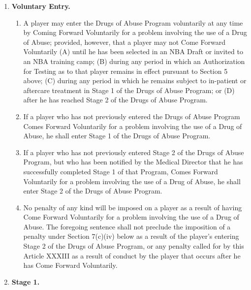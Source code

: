 \documentclass[
]{book}
\providecommand{\tightlist}{%
  \setlength{\itemsep}{0pt}\setlength{\parskip}{0pt}}
\begin{document}
\begin{enumerate}
\def\labelenumi{(\alph{enumi})}
\tightlist
\item
  \textbf{Voluntary Entry.}

  \begin{enumerate}
  \def\labelenumii{(\roman{enumii})}
  \tightlist
  \item
    A player may enter the Drugs of Abuse Program voluntarily at any time by Coming Forward Voluntarily for a problem involving the use of a Drug of Abuse; provided, however, that a player may not Come Forward Voluntarily (A) until he has been selected in an NBA Draft or invited to an NBA training camp; (B) during any period in which an Authorization for Testing as to that player remains in effect pursuant to Section 5 above; (C) during any period in which he remains subject to in-patient or aftercare treatment in Stage 1 of the Drugs of Abuse Program; or (D) after he has reached Stage 2 of the Drugs of Abuse Program.
  \item
    If a player who has not previously entered the Drugs of Abuse Program Comes Forward Voluntarily for a problem involving the use of a Drug of Abuse, he shall enter Stage 1 of the Drugs of Abuse Program.
  \item
    If a player who has not previously entered Stage 2 of the Drugs of Abuse Program, but who has been notified by the Medical Director that he has successfully completed Stage 1 of that Program, Comes Forward Voluntarily for a problem involving the use of a Drug of Abuse, he shall enter Stage 2 of the Drugs of Abuse Program.
  \item
    No penalty of any kind will be imposed on a player as a result of having Come Forward Voluntarily for a problem involving the use of a Drug of Abuse. The foregoing sentence shall not preclude the imposition of a penalty under Section 7(c)(iv) below as a result of the player's entering Stage 2 of the Drugs of Abuse Program, or any penalty called for by this Article XXXIII as a result of conduct by the player that occurs after he has Come Forward Voluntarily.
  \end{enumerate}
\item
  \textbf{Stage 1.}


\end{enumerate}
\end{document}
